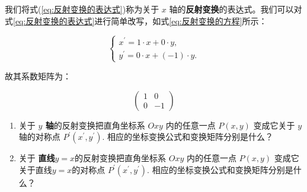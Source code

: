 \documentclass[lang=cn,newtx,10pt,scheme=chinese]{elegantbook}
\begin{document}
我们将式(\ref{eq:反射变换的表达式})称为关于 $x$ 轴的\textcolor{third}{\bf 反射变换}的表达式。我们可以对式\ref{eq:反射变换的表达式}进行简单改写，如式\ref{eq:反射变换的方程}所示：

\begin{equation}
\left\{\begin{array}{l}
x^{\prime}=1 \cdot x + 0\cdot y, \\
y^{\prime}= 0\cdot x + (-1) \cdot y .
\end{array}\right.
\label{eq:反射变换的方程}
\end{equation}

故其系数矩阵为：

\begin{equation}
\left(\begin{array}{rr}
1  & 0 \\
0  & -1
\end{array}\right)
\label{eq:反射变换示例矩阵}
\end{equation}


\vspace{0.5cm}

\begin{exercise}
\begin{enumerate}
    \item 关于 \textbf{$y$ 轴}的反射变换把直角坐标系 $O x y$ 内的任意一点 $P(x, y)$ 变成它关于 $y$ 轴的对称点 $P^{\prime}\left(x^{\prime}, y^{\prime}\right)$. 相应的坐标变换公式和变换矩阵分别是什么？
    \item 关于 \textbf{直线$y=x$}的反射变换把直角坐标系 $O x y$ 内的任意一点 $P(x, y)$ 变成它关于直线$y=x$的对称点 $P^{\prime}\left(x^{\prime}, y^{\prime}\right)$. 相应的坐标变换公式和变换矩阵分别是什么？
\end{enumerate}
\end{exercise}
\end{document}
